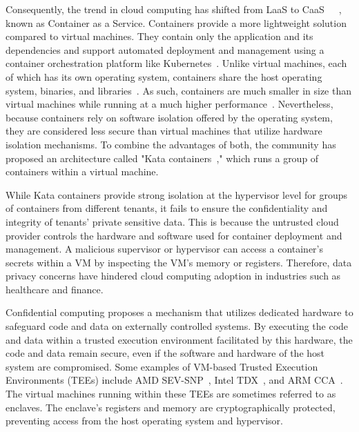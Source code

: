 Consequently, the trend in cloud computing has shifted from LaaS to CaaS~\cite*{Azure_container}~\cite*{Amazon_container}~\cite*{google_container}, known as Container as a Service. Containers provide a more lightweight solution compared to virtual machines. They contain only the application and its dependencies and support automated deployment and management using a 
container orchestration platform like Kubernetes~\cite*{k8s}. Unlike virtual machines, each of which has its own operating system, containers share the host operating system, binaries, and libraries~\cite*{container_vs_vm}. As such, containers are much smaller in size than virtual machines while running at a much higher performance~\cite*{Shirinbab2020PerformanceEO}. 
Nevertheless, because containers rely on software isolation offered by the operating system, they are considered less secure than virtual machines that utilize hardware isolation mechanisms. To combine the advantages of both, the community has proposed an architecture called "Kata containers~\cite*{Kata-Containers}," which 
runs a group of containers within a virtual machine.
 
While Kata containers provide strong isolation at the hypervisor level for groups of containers from different tenants, it fails to ensure the confidentiality and integrity of tenants' private sensitive data. This is because the untrusted cloud provider controls the hardware and software used for 
container deployment and management. A malicious supervisor or hypervisor can access a container's secrets within a VM by inspecting the VM's memory or registers. Therefore, data privacy concerns have hindered cloud computing adoption in industries such as healthcare and finance.
 
Confidential computing proposes a mechanism that utilizes dedicated hardware to safeguard code and data on externally controlled systems. By executing the code and data within a trusted execution environment facilitated by this hardware, the code and data remain secure, even if the software and 
hardware of the host system are compromised. Some examples of VM-based Trusted Execution Environments (TEEs) include AMD SEV-SNP~\cite*{SEV_SNP_white_book}, Intel TDX~\cite*{Intel_tdx_whitepaper}, and ARM CCA~\cite*{280904}. The virtual machines running within these TEEs are sometimes referred to as enclaves. The enclave's registers and memory are 
cryptographically protected, preventing access from the host operating system and hypervisor.
 
 
 
